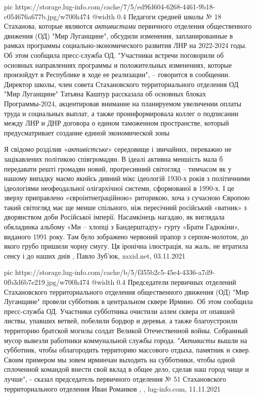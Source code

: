 \ifcmt
  pic https://storage.lug-info.com/cache/7/5/ed9fd604-6268-4461-9b18-c054676a677b.jpg/w700h474
  @width 0.4
\fi
Педагоги средней школы № 18 Стаханова, которые являются \emph{активистами} первичного
отделения общественного движения (ОД) "Мир Луганщине", обсудили изменения,
запланированные в рамках программы социально-экономического развития ЛНР на
2022-2024 годы. Об этом сообщила пресс-служба ОД.  "Участники встречи
поговорили об основных направлениях программы и положительных изменениях,
которые произойдут в Республике в ходе ее реализации", – говорится в сообщении.
Директор школы, член совета Стахановского территориального отделения ОД "Мир
Луганщине" Татьяна Кашпур рассказала об основных блоках Программы-2024,
акцентировав внимание на планируемом увеличении оплаты труда и социальных
выплат, а также проинформировала коллег о подписании между ЛНР и ДНР договора о
едином таможенном пространстве, который предусматривает создание единой
экономической зоны
  

Я свідомо розділив «\emph{активістське}» середовище і звичайних, переважно не
зацікавлених політикою співгромадян. В ідеалі активна меншість мала б
передавати решті громадян новий, проґресивний світогляд – тимчасом як у нашому
випадку маємо якийсь дивний мікс ідеологій 1930-х років з політичними
ідеологіями неофеодальної олігархічної системи, сформованої в 1990-х. І це
зверху приправлено «євроінтнеґраційною» риторикою, хоча з сучасною Європою
такий світогляд має ще менше спільного, ніж пересічний російський «ватник» з
дворянством доби Російської імперії.  Насамкінець нагадаю, як виглядала
обкладинка альбому «Ми – хлопці з Бандерштадту» гурту «Брати Гадюкіни»,
виданого 1991 року. Там було зображено червоний прапор з серпом-молотом, до
якого грубо пришили чорну смугу. Ця іронічна ілюстрація, на жаль, не втратила
сенсу і до наших днів
, Павло Зуб'юк, zaxid.net, 03.11.2021

\ifcmt
  pic https://storage.lug-info.com/cache/b/5/f355b2c5-45e4-4336-a7d9-0fb3d6b7e219.jpg/w700h474
  @width 0.4
\fi
Председатели первичных отделений Стахановского территориального отделения
общественного движения (ОД) "Мир Луганщине" провели субботник в центральном
сквере Ирмино. Об этом сообщила пресс-служба ОД.  Участники субботника очистили
аллеи сквера от опавшей листвы, упавших ветвей, побелили бордюр и деревья, а
также благоустроили территорию братской могилы солдат Великой Отечественной
войны. Собранный мусор вывезли работники коммунальной службы города.
"\emph{Активисты} вышли на субботник, чтобы облагородить территорию массового
отдыха, памятник и сквер. Своим примером мы зовем ирминчан выходить на
субботники, чтобы одной сплоченной командой внести свой вклад в общее дело,
сделав наш город чище и лучше", - сказал председатель первичного отделения № 51
Стахановского территориального отделения Иван Романков
, 
, lug-info.com, 11.11.2021
